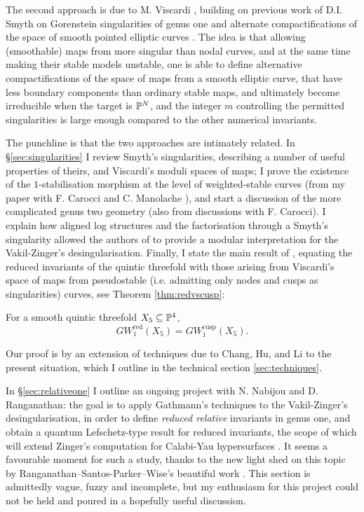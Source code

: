 The second approach is due to M. Viscardi \cite{VISC}, building on previous work of D.I. Smyth on Gorenstein singularities of genus one and alternate compactifications of the space of smooth pointed elliptic curves \cite{SMY1}. The idea is that allowing (smoothable) maps from more singular than nodal curves, and at the same time making their stable models unstable, one is able to define alternative compactifications of the space of maps from a smooth elliptic curve, that have less boundary components than ordinary stable maps, and ultimately become irreducible when the target is $\mathbb P^N$, and the integer $m$ controlling the permitted singularities is large enough compared to the other numerical invariants.

The punchline is that the two approaches are intimately related. In \S \ref{sec:singularities} I review Smyth's singularities, describing a number of useful properties of theirs, and Viscardi's moduli spaces of maps; I prove the existence of the $1$-stabilisation morphism at the level of weighted-stable curves (from my paper with F. Carocci and C. Manolache \cite{BCM}), and start a discussion of the more complicated genus two geometry (also from discussions with F. Carocci). I explain how aligned log structures and the factorisation through a Smyth's singularity allowed the authors of \cite{RSPW} to provide a modular interpretation for the Vakil-Zinger's desingularisation. Finally, I state the main result of \cite{BCM}, equating the reduced invariants of the quintic threefold with those arising from Viscardi's space of maps from pseudostable \cite{Schubert} (i.e. admitting only nodes and cusps as singularities) curves, see Theorem \ref{thm:redvscusp}:
\begin{thm*}
 For a smooth quintic threefold $X_5\subseteq \mathbb P^4$, \[GW_1^{\mathrm{red}}(X_5)=GW_1^{\mathrm{cusp}}(X_5).\]
\end{thm*}
Our proof is by an extension of techniques due to Chang, Hu, and Li to the present situation, which I outline in the technical section \ref{sec:techniques}.

In \S \ref{sec:relativeone} I outline an ongoing project with N. Nabijou and D. Ranganathan: the goal is to apply Gathmann's techniques to the Vakil-Zinger's desingularisation, in order to define \emph{reduced relative} invariants in genus one, and obtain a quantum Lefschetz-type result for reduced invariants, the scope of which will extend Zinger's computation for Calabi-Yau hypersurfaces \cite{Zinger-CYhyp}. It seems a favourable moment for such a study, thanks to the new light shed on this topic by Ranganathan--Santos-Parker--Wise's beautiful work \cites{RSPW,RSPW2}. This section is admittedly vague, fuzzy and incomplete, but my enthusiasm for this project could not be held and poured in a hopefully useful discussion.

